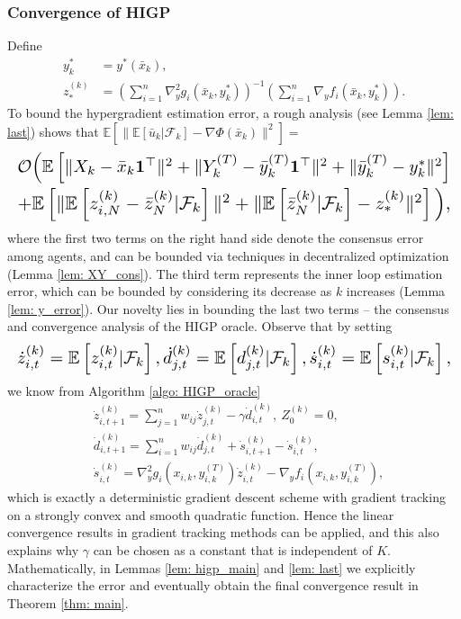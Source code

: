 \documentclass{article}
\theoremstyle{plain}
\theoremstyle{definition}
\theoremstyle{remark}
\newcommand{\E}{\mathbb{E}}
\newcommand{\F}{\mathcal{F}}
\newcommand{\cO}{\mathcal{O}}
\newcommand{\bfonet}{\mathbf{1}^{\top}}
\begin{document}
\subsubsection{Convergence of HIGP}
Define
\begin{align*}
    y_k^* &= y^*(\bar{x}_k), \\
    z_{*}^{(k)} &= \left(\sum_{i=1}^{n}\nabla_y^2g_i(\bar{x}_k,y_k^*)\right)^{-1}\left(\sum_{i=1}^{n}\nabla_y f_i(\bar{x}_k, y_k^*)\right).
\end{align*}
To bound the hypergradient estimation error, a rough analysis (see Lemma \ref{lem: last}) shows that $\E\left[\|\E\left[\bar{u}_k|\F_k\right] - \nabla\Phi(\bar{x}_k)\|^2\right] =$
\[
    \begin{aligned}
        &\resizebox{\hsize}{!}{$\cO\Big(\E\left[\|X_k - \bar{x}_k\bfonet\|^2 + \|Y_k^{(T)} - \bar{y}_k^{(T)}\bfonet\|^2 + \|\bar{y}_k^{(T)} - y_k^*\|^2\right]$} \\ 
        &\resizebox{\hsize}{!}{$+ \E\left[\|\E\left[z_{i,N}^{(k)} - \bar{z}_{N}^{(k)}|\F_k\right]\|^2 + \|\E\left[\bar{z}_N^{(k)}|\F_k\right] - z_*^{(k)}\|^2\right]\Big),$}
    \end{aligned}
\]
where the first two terms on the right hand side denote the consensus error among agents, and can be bounded via techniques in decentralized optimization (Lemma \ref{lem: XY_cons}). The third term represents the inner loop estimation error, which can be bounded by considering its decrease as $k$ increases (Lemma \ref{lem: y_error}). Our novelty lies in bounding the last two terms -- the consensus and convergence analysis of the HIGP oracle. Observe that
by setting 
\[
    \resizebox{\hsize}{!}{$\dot z_{i,t}^{(k)} = \E\left[z_{i,t}^{(k)}|\F_k\right], \dot d_{j,t}^{(k)} =\E\left[d_{j,t}^{(k)}|\F_k\right], \dot s_{i,t}^{(k)} = \E\left[s_{i,t}^{(k)}|\F_k\right],$}
\]
we know from Algorithm \ref{algo: HIGP_oracle}
\begin{align*}
    &\dot z_{i,t+1}^{(k)} = \sum_{j=1}^{n}w_{ij}\dot z_{j,t}^{(k)} - \gamma \dot d_{i,t}^{(k)},\  Z_0^{(k)} = 0,\\
    &\dot d_{i,t+1}^{(k)} =\sum_{i=1}^{n}w_{ij}\dot d_{j,t}^{(k)} + \dot s_{i,t+1}^{(k)} - \dot s_{i,t}^{(k)}, \\
    &\dot s_{i,t}^{(k)} = \nabla_y^2g_i(x_{i,k},y_{i,k}^{(T)})\dot z_{i,t}^{(k)}- \nabla_yf_i(x_{i,k},y_{i,k}^{(T)}),
\end{align*}
which is exactly a deterministic gradient descent scheme with gradient tracking on a strongly convex and smooth quadratic function. Hence the linear convergence results in gradient tracking methods can be applied, and this also explains why $\gamma$ can be chosen as a constant that is independent of $K$. Mathematically, in Lemmas \ref{lem: higp_main} and \ref{lem: last} we explicitly characterize the error and eventually obtain the final convergence result in Theorem \ref{thm: main}.
\end{document}
